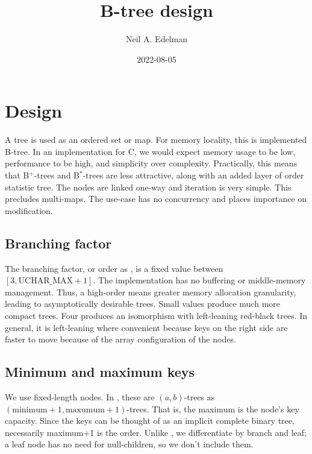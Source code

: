 \documentclass[12pt]{article}
\author{Neil A. Edelman}
\title{B-tree design}
\date{2022-08-05}
\begin{document}
\maketitle


\section{Design}

A tree is used as an ordered set or map. For memory locality, this is implemented B-tree\cite{bayer1972organization}. In an implementation for C, we would expect memory usage to be low, performance to be high, and simplicity over complexity. Practically, this means that B$^+$-trees and B$^*$-trees are less attractive, along with an added layer of order statistic tree. The nodes are linked one-way and iteration is very simple. This precludes multi-maps. The use-case has no concurrency and places importance on modification.

\subsection{Branching factor}

The branching factor, or order as \cite{knuth1998sorting}, is a fixed value between $[3,\text{UCHAR\_MAX}+1]$. The implementation has no buffering or middle-memory management. Thus, a high-order means greater memory allocation granularity, leading to asymptotically desirable trees. Small values produce much more compact trees. Four produces an isomorphism with left-leaning red-black trees\cite{sedgewick2008left}. In general, it is left-leaning where convenient because keys on the right side are faster to move because of the array configuration of the nodes.

\subsection{Minimum and maximum keys}

We use fixed-length nodes. In \cite{goodrich2011data}, these are $(a,b)$-trees as $(\text{minimum}+1, \text{maxumum}+1)$\nobreakdash-trees. That is, the maximum is the node's key capacity. Since the keys can be thought of as an implicit complete binary tree, necessarily maximum+1 is the order. Unlike \cite{knuth1998sorting}, we differentiate by branch and leaf; a leaf node has no need for null-children, so we don't include them.
\end{document}
